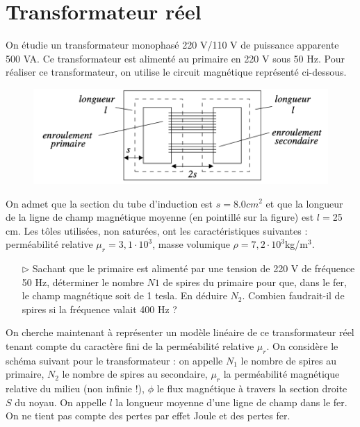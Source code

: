 \documentclass{report}
\begin{document}
\newpage

\section*{Transformateur réel}

On étudie un transformateur monophasé 220 V/110 V de puissance apparente 500 VA. Ce transformateur est alimenté au primaire en 220 V sous 50 Hz. Pour réaliser ce transformateur, on utilise le circuit magnétique représenté ci-dessous.

\begin{figure}[h!]
	\centering
		\includegraphics[scale=0.5]{transfo.png}
\end{figure}		

On admet que la section du tube d’induction est $s = 8.0 cm^2$ et que la longueur de la ligne de champ magnétique moyenne (en pointillé sur la figure) est $l = $25 cm.
Les tôles utilisées, non saturées, ont les caractéristiques suivantes : perméabilité
relative $\mu_r =3,1\cdot10^3$, masse volumique $\rho=7,2\cdot10^3$kg/m$^3$.

\begin{itemize}

	\item[$\triangleright$] Sachant que le primaire est alimenté par une tension de 220 V de fréquence 50 Hz, déterminer le nombre $N1$ de spires du primaire pour que, dans le fer, le champ magnétique soit de 1 tesla. En déduire $N_2$. Combien faudrait-il de spires si la fréquence valait 400 Hz ?

\end{itemize}

On cherche maintenant à représenter un modèle linéaire de ce transformateur réel tenant compte du caractère fini de la perméabilité relative $\mu_r$. On considère le schéma suivant pour le transformateur : on appelle $N_1$ le nombre de spires au primaire, $N_2$ le nombre de spires au secondaire, $\mu_r$ la perméabilité magnétique relative du milieu (non infinie !), $\phi$ le flux magnétique à travers la section droite $S$ du noyau. On appelle $l$ la longueur moyenne d’une ligne de champ dans le fer. On ne tient pas compte des pertes par effet Joule et des pertes fer.
\end{document}
